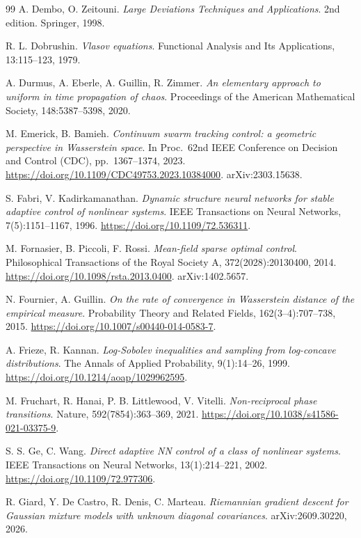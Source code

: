 \begin{thebibliography}{99}
A. Dembo, O. Zeitouni.
\emph{Large Deviations Techniques and Applications}.
2nd edition. Springer, 1998.

R. L. Dobrushin.
\emph{Vlasov equations}.
Functional Analysis and Its Applications, 13:115--123, 1979.

A. Durmus, A. Eberle, A. Guillin, R. Zimmer.
\emph{An elementary approach to uniform in time propagation of chaos}.
Proceedings of the American Mathematical Society, 148:5387--5398, 2020.

M. Emerick, B. Bamieh.
\emph{Continuum swarm tracking control: a geometric perspective in Wasserstein space}.
In Proc.\ 62nd IEEE Conference on Decision and Control (CDC), pp.~1367--1374, 2023.
\url{https://doi.org/10.1109/CDC49753.2023.10384000}.
arXiv:2303.15638.

S. Fabri, V. Kadirkamanathan.
\emph{Dynamic structure neural networks for stable adaptive control of nonlinear systems}.
IEEE Transactions on Neural Networks, 7(5):1151--1167, 1996.
\url{https://doi.org/10.1109/72.536311}.

M. Fornasier, B. Piccoli, F. Rossi.
\emph{Mean-field sparse optimal control}.
Philosophical Transactions of the Royal Society A, 372(2028):20130400, 2014.
\url{https://doi.org/10.1098/rsta.2013.0400}.
arXiv:1402.5657.

N. Fournier, A. Guillin.
\emph{On the rate of convergence in Wasserstein distance of the empirical measure}.
Probability Theory and Related Fields, 162(3--4):707--738, 2015.
\url{https://doi.org/10.1007/s00440-014-0583-7}.

A. Frieze, R. Kannan.
\emph{Log-Sobolev inequalities and sampling from log-concave distributions}.
The Annals of Applied Probability, 9(1):14--26, 1999.
\url{https://doi.org/10.1214/aoap/1029962595}.

M. Fruchart, R. Hanai, P. B. Littlewood, V. Vitelli.
\emph{Non-reciprocal phase transitions}.
Nature, 592(7854):363--369, 2021.
\url{https://doi.org/10.1038/s41586-021-03375-9}.

S. S. Ge, C. Wang.
\emph{Direct adaptive NN control of a class of nonlinear systems}.
IEEE Transactions on Neural Networks, 13(1):214--221, 2002.
\url{https://doi.org/10.1109/72.977306}.

R. Giard, Y. De Castro, R. Denis, C. Marteau.
\emph{Riemannian gradient descent for Gaussian mixture models with unknown diagonal covariances}.
arXiv:2609.30220, 2026.


\end{thebibliography}
